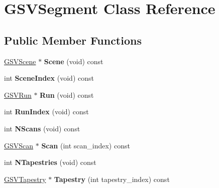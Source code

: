 \hypertarget{class_g_s_v_segment}{}\section{G\+S\+V\+Segment Class Reference}
\label{class_g_s_v_segment}
\subsection*{Public Member Functions}
\begin{DoxyCompactItemize}
\item 
\hyperlink{class_g_s_v_scene}{G\+S\+V\+Scene} $\ast$ {\bfseries Scene} (void) const \hypertarget{class_g_s_v_segment_aa8427188c0c6ebc18e40e41f50e30ae9}{}\label{class_g_s_v_segment_aa8427188c0c6ebc18e40e41f50e30ae9}

\item 
int {\bfseries Scene\+Index} (void) const \hypertarget{class_g_s_v_segment_aca0af5de35dbd8519f7b9c41d635db79}{}\label{class_g_s_v_segment_aca0af5de35dbd8519f7b9c41d635db79}

\item 
\hyperlink{class_g_s_v_run}{G\+S\+V\+Run} $\ast$ {\bfseries Run} (void) const \hypertarget{class_g_s_v_segment_a25cc8b234fb5047e6f3231d67016d672}{}\label{class_g_s_v_segment_a25cc8b234fb5047e6f3231d67016d672}

\item 
int {\bfseries Run\+Index} (void) const \hypertarget{class_g_s_v_segment_a707eb0886565cf5213aa489f0d3c481a}{}\label{class_g_s_v_segment_a707eb0886565cf5213aa489f0d3c481a}

\item 
int {\bfseries N\+Scans} (void) const \hypertarget{class_g_s_v_segment_a9fbb4f07eb0dce8d65f80e839cbe8bff}{}\label{class_g_s_v_segment_a9fbb4f07eb0dce8d65f80e839cbe8bff}

\item 
\hyperlink{class_g_s_v_scan}{G\+S\+V\+Scan} $\ast$ {\bfseries Scan} (int scan\+\_\+index) const \hypertarget{class_g_s_v_segment_a78632f55a4cfac4acddf3f4d42193550}{}\label{class_g_s_v_segment_a78632f55a4cfac4acddf3f4d42193550}

\item 
int {\bfseries N\+Tapestries} (void) const \hypertarget{class_g_s_v_segment_af2afb03bea87321d5a41a29e359eee3b}{}\label{class_g_s_v_segment_af2afb03bea87321d5a41a29e359eee3b}

\item 
\hyperlink{class_g_s_v_tapestry}{G\+S\+V\+Tapestry} $\ast$ {\bfseries Tapestry} (int tapestry\+\_\+index) const \hypertarget{class_g_s_v_segment_a78a77d6e850b459bd052b21141a37163}{}\label{class_g_s_v_segment_a78a77d6e850b459bd052b21141a37163}


\end{DoxyCompactItemize}
